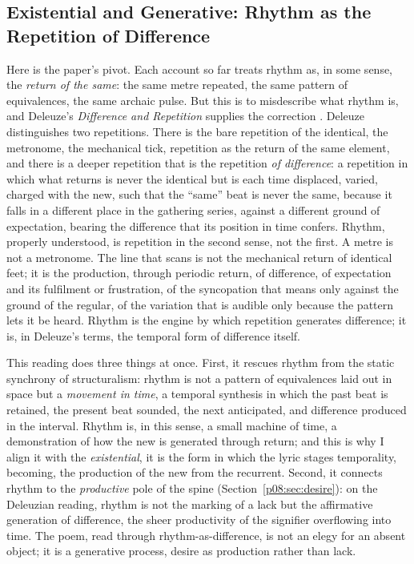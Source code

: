 \subsection{Existential and Generative: Rhythm as the Repetition of Difference}\label{p08:sec:repdiff}

Here is the paper's pivot. Each account so far treats rhythm as, in some sense, the \emph{return of the same}: the same metre repeated, the same pattern of equivalences, the same archaic pulse. But this is to misdescribe what rhythm is, and Deleuze's \emph{Difference and Repetition} supplies the correction \parencite{deleuze1968difference}. Deleuze distinguishes two repetitions. There is the bare repetition of the identical, the metronome, the mechanical tick, repetition as the return of the same element, and there is a deeper repetition that is the repetition \emph{of difference}: a repetition in which what returns is never the identical but is each time displaced, varied, charged with the new, such that the ``same'' beat is never the same, because it falls in a different place in the gathering series, against a different ground of expectation, bearing the difference that its position in time confers. Rhythm, properly understood, is repetition in the second sense, not the first. A metre is not a metronome. The line that scans is not the mechanical return of identical feet; it is the production, through periodic return, of difference, of expectation and its fulfilment or frustration, of the syncopation that means only against the ground of the regular, of the variation that is audible only because the pattern lets it be heard. Rhythm is the engine by which repetition generates difference; it is, in Deleuze's terms, the temporal form of difference itself.

This reading does three things at once. First, it rescues rhythm from the static synchrony of structuralism: rhythm is not a pattern of equivalences laid out in space but a \emph{movement in time}, a temporal synthesis in which the past beat is retained, the present beat sounded, the next anticipated, and difference produced in the interval. Rhythm is, in this sense, a small machine of time, a demonstration of how the new is generated through return; and this is why I align it with the \emph{existential}, it is the form in which the lyric stages temporality, becoming, the production of the new from the recurrent. Second, it connects rhythm to the \emph{productive} pole of the spine (Section~\ref{p08:sec:desire}): on the Deleuzian reading, rhythm is not the marking of a lack but the affirmative generation of difference, the sheer productivity of the signifier overflowing into time. The poem, read through rhythm-as-difference, is not an elegy for an absent object; it is a generative process, desire as production rather than lack.

